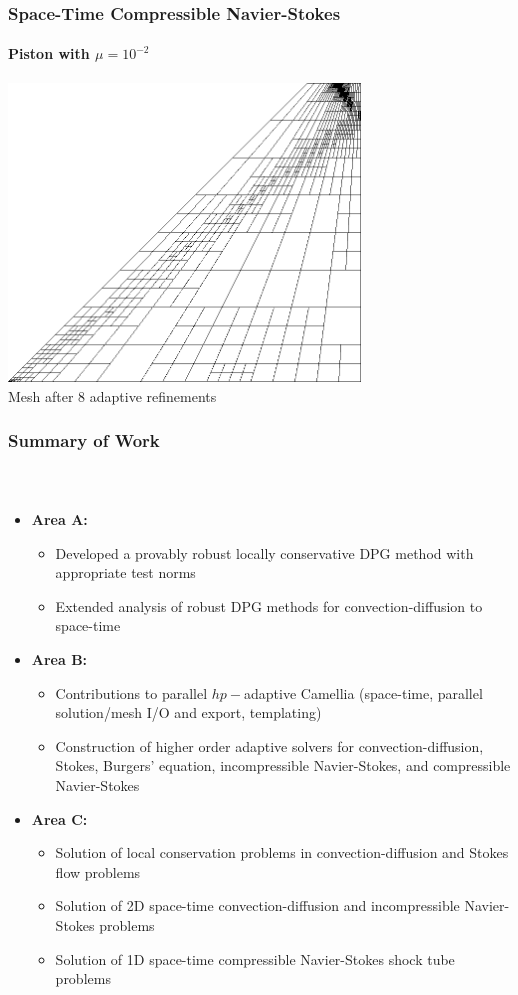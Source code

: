\documentclass[18pt,xcolor=table]{beamer}
\begin{document}
\begin{frame}[t]
\frametitle{Space-Time Compressible Navier-Stokes}
\framesubtitle{Piston with $\mu=10^{-2}$}  %

\centering
\includegraphics[width=0.7\textwidth]{Piston/Piston_mesh.png}
\\Mesh after 8 adaptive refinements
\end{frame}



\begin{frame}
\frametitle{Summary of Work}
\framesubtitle{~}
\vspace{-3ex}
\begin{itemize}
  \item\textbf{Area A:}
  \begin{itemize}
    \item Developed a provably robust locally conservative DPG method with appropriate test norms
    \item Extended analysis of robust DPG methods for convection-diffusion to space-time
  \end{itemize}
  \item\textbf{Area B:}
  \begin{itemize}
    \item Contributions to parallel $hp-$adaptive Camellia (space-time, parallel solution/mesh I/O and export, templating)
    \item Construction of higher order adaptive solvers for convection-diffusion, Stokes, Burgers' equation, incompressible Navier-Stokes,
    and compressible Navier-Stokes
  \end{itemize}
  \item\textbf{Area C:}
  \begin{itemize}
    \item Solution of local conservation problems in convection-diffusion and Stokes flow problems
    \item Solution of 2D space-time convection-diffusion and incompressible Navier-Stokes problems
    \item Solution of 1D space-time compressible Navier-Stokes shock tube problems
  \end{itemize}
\end{itemize}
\end{frame}
\end{document}
